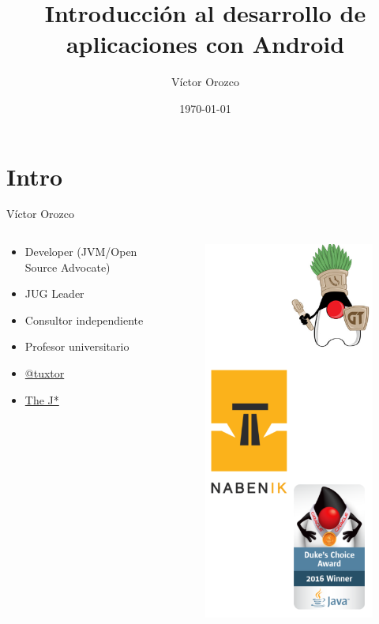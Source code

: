 \documentclass{beamer}
\title{Introducción al desarrollo de aplicaciones con Android}
\author{Víctor Orozco}
\institute{Nabenik}
\date{\today}
\begin{document}
\frame{\titlepage}

\section{Intro}


\begin{frame}{Víctor Orozco}
     \begin{columns}[T] %
	     \begin{column}[T]{5cm} %
				\begin{itemize}
				\item Developer (JVM/Open Source Advocate)
				\item JUG Leader
				\item Consultor independiente
				\item Profesor universitario
				\item \href{https://twitter.com/tuxtor}{@tuxtor}
				\item \href{http://vorozco.com}{The J*} 
				\end{itemize}
	     \end{column}
	     \begin{column}[T]{5cm} %
            \begin{figure}
                \centering
                \includegraphics[width=0.6\linewidth]{Images/logos}
            \end{figure}


\end{column}
\end{columns}
\end{frame}
\end{document}
